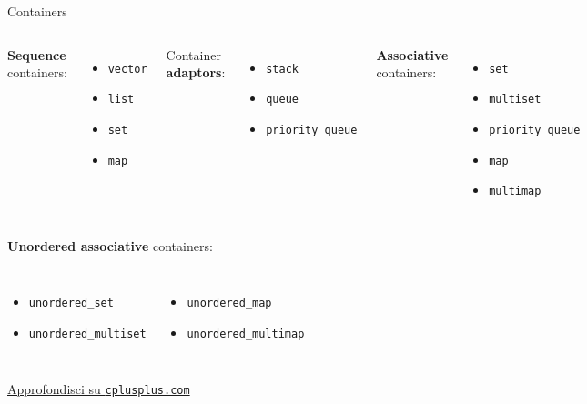 \documentclass[xcolor={dvipsnames, svgnames, x11names, table}, 10pt]{beamer}
\begin{document}
\newlength\origleftmargini
\setlength\origleftmargini\leftmargini
\setlength{\leftmargini}{10pt}
\begin{frame}{Containers}

\begin{columns}[T,onlytextwidth]
\textbf{Sequence} containers:
\begin{itemize}
    \item \texttt{vector}
    \item \texttt{list}
    \item \texttt{set}
    \item \texttt{map}
\end{itemize}

Container \textbf{adaptors}:
\begin{itemize}
    \item \texttt{stack}
    \item \texttt{queue}
    \item \texttt{priority\_queue}
\end{itemize}

\textbf{Associative} containers:
\begin{itemize}
    \item \texttt{set}
    \item \texttt{multiset}
    \item \texttt{priority\_queue}
    \item \texttt{map}
    \item \texttt{multimap}
\end{itemize}

\end{columns}

\vspace{10pt}
\textbf{Unordered associative} containers:
\begin{columns}[T,onlytextwidth]
\begin{itemize}
    \item \texttt{unordered\_set}
    \item \texttt{unordered\_multiset}
\end{itemize}

\begin{itemize}
    \item \texttt{unordered\_map}
    \item \texttt{unordered\_multimap}
\end{itemize}
\end{columns}

\vspace*{\fill}

\href{https://www.cplusplus.com/reference/stl/}{Approfondisci su \texttt{cplusplus.com} \ExternalLink}

\end{frame}
\setlength{\leftmargini}{\origleftmargini}
\end{document}

